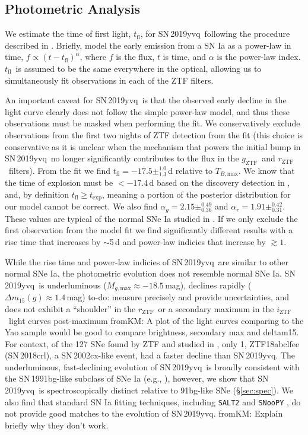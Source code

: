\documentclass[twocolumn]{aastex63}
\newcommand{\fromkate}[1]{{\color{brown} fromKM: {#1}}}
\newcommand{\todo}[1]{{\color{magenta} to-do: {#1}}}
\newcommand{\rztf}{$r_\mathrm{ZTF}$}
\newcommand{\gztf}{$g_\mathrm{ZTF}$}
\newcommand{\iztf}{$i_\mathrm{ZTF}$}
\newcommand{\tfl}{$t_\mathrm{fl}$}
\newcommand{\tbmax}{$T_{B,\mathrm{max}}$}
\newcommand{\sn}{SN\,2019yvq}
\begin{document}
\subsection{Photometric Analysis}\label{sec:phot}

We estimate the time of first light, \tfl, for \sn\ following the procedure
described in \citet{Miller20}. Briefly, \citet{Miller20} model the early
emission from a SN Ia as a power-law in time, $f \propto (t -
t_\mathrm{fl})^\alpha$, where $f$ is the flux, $t$ is time, and $\alpha$ is
the power-law index. \tfl\ is assumed to be the same everywhere in the
optical, allowing us to simultaneously fit observations in each of the ZTF
filters.

An important caveat for \sn\ is that the observed early decline in the light
curve clearly does not follow the simple power-law model, and thus these
observations must be masked when performing the fit. We conservatively
exclude observations from the first two nights of ZTF detection from the fit
(this choice is conservative as it is unclear when the mechanism that powers
the initial bump in \sn\ no longer significantly contributes to the flux in
the \gztf\ and \rztf\ filters). From the fit we find \tfl$ = -17.5
\pm^{1.0}_{1.3}$\,d relative to \tbmax. We know that the time of explosion
must be $< -17.4$\,d based on the discovery detection in \citealt{Itagaki19},
and, by definition $t_\mathrm{fl} \ge t_\mathrm{exp}$, meaning a portion of
the posterior distribution for our model cannot be correct. We also find
$\alpha_g = 2.15 \pm^{0.49}_{0.36}$ and $\alpha_r = 1.91 \pm^{0.42}_{0.31}$.
These values are typical of the normal SNe Ia studied in \citet{Miller20}. If
we only exclude the first observation from the model fit we find
significantly different results with a rise time that increases by $\sim$5\,d
and power-law indicies that increase by $\gtrsim 1$.

While the rise time and power-law indicies of \sn\ are similar to other
normal SNe Ia, the photometric evolution does not resemble normal SNe Ia.
\sn\ is underluminous ($M_{g,\mathrm{max}} \approx -18.5$\,mag), declines
rapidly ($\Delta m_{15}(g) \approx 1.4$\,mag) \todo{measure precisely and
provide uncertainties}, and does not exhibit a ``shoulder'' in the \rztf\ or a
secondary maximum in the \iztf\ light curves post-maximum \fromkate{A plot of the light curves comparing to the Yao sample would be good to compare brightness, secondary max and deltam15}. For context, of
the 127 SNe found by ZTF and studied in \citet{Yao19}, only 1, ZTF18abclfee
(SN\,2018crl), a SN\,2002cx-like event, had a faster decline than \sn. The
underluminous, fast-declining evolution of \sn\ is broadly consistent with
the SN\,1991bg-like subclass of SNe Ia (e.g., \citealt{Taubenberger17}),
however, we show that \sn\ is spectroscopically distinct relative to
91bg-like SNe (\S\ref{sec:spec}). We also find that standard SN Ia fitting
techniques, including \texttt{SALT2} \citep{Guy07} and \texttt{SNooPY}
\citep{Burns11}, do not provide good matches to the evolution of \sn. \fromkate{Explain briefly why they don't work.}
\end{document}
